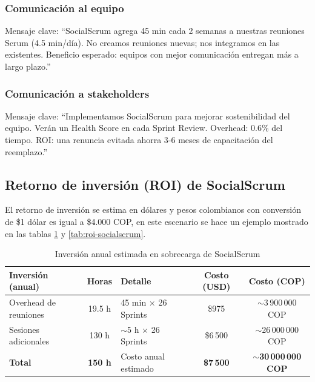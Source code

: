 \subsubsection{Comunicación al equipo}

Mensaje clave: ``SocialScrum agrega 45 min cada 2 semanas a nuestras reuniones Scrum (4.5 min/día). No creamos reuniones nuevas; nos integramos en las existentes. Beneficio esperado: equipos con mejor comunicación entregan más a largo plazo.''
\subsubsection{Comunicación a stakeholders}

Mensaje clave: ``Implementamos SocialScrum para mejorar sostenibilidad del equipo. Verán un Health Score en cada Sprint Review. Overhead: 0.6\% del tiempo. ROI: una renuncia evitada ahorra 3-6 meses de capacitación del reemplazo.''

\subsection{Retorno de inversión (ROI) de SocialScrum}

El retorno de inversión se estima en dólares y pesos colombianos con conversión de \$1 dólar es igual a \$4.000 COP, en este escenario se hace un ejemplo mostrado en las tablas \ref{tab:inversion-anual} y \ref{tab:roi-socialscrum}.

\begin{table}[h]
    \centering
    \small
    \begin{tabularx}{\textwidth}{|l|c|X|c|c|}
        \hline
        \textbf{Inversión (anual)} & \textbf{Horas}                  & \textbf{Detalle} & \textbf{Costo (USD)} & \textbf{Costo (COP)} \\
        \hline
        Overhead de reuniones
                                   & 19.5 h
                                   & 45 min $\times$ 26 Sprints
                                   & \$975
                                   & $\sim$3\,900\,000 COP                                                                            \\
        \hline
        Sesiones adicionales
                                   & 130 h
                                   & $\sim$5 h $\times$ 26 Sprints
                                   & \$6\,500
                                   & $\sim$26\,000\,000 COP                                                                           \\
        \hline
        \textbf{Total}
                                   & \textbf{150 h}
                                   & Costo anual estimado
                                   & \textbf{\$7\,500}
                                   & \textbf{$\sim$30\,000\,000 COP}                                                                  \\
        \hline
    \end{tabularx}
    \caption{Inversión anual estimada en sobrecarga de SocialScrum}
    \label{tab:inversion-anual}
\end{table}
\FloatBarrier

